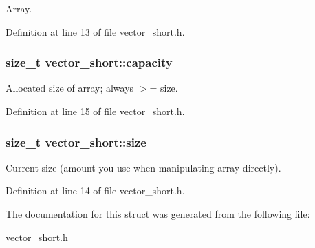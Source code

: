 \-Array. 



\-Definition at line 13 of file vector\-\_\-short.\-h.

\hypertarget{structvector__short_a06409947c0c59b65b52537c6bade6569}{
\subsubsection[{capacity}]{\setlength{\rightskip}{0pt plus 5cm}size\-\_\-t {\bf vector\-\_\-short\-::capacity}}}\label{structvector__short_a06409947c0c59b65b52537c6bade6569}


\-Allocated size of array; always $>$= size. 



\-Definition at line 15 of file vector\-\_\-short.\-h.

\hypertarget{structvector__short_a40844e43099756849900956e128123a3}{
\subsubsection[{size}]{\setlength{\rightskip}{0pt plus 5cm}size\-\_\-t {\bf vector\-\_\-short\-::size}}}\label{structvector__short_a40844e43099756849900956e128123a3}


\-Current size (amount you use when manipulating array directly). 



\-Definition at line 14 of file vector\-\_\-short.\-h.



\-The documentation for this struct was generated from the following file\-:\begin{DoxyCompactItemize}
\item 
\hyperlink{vector__short_8h}{vector\-\_\-short.\-h}\end{DoxyCompactItemize}
